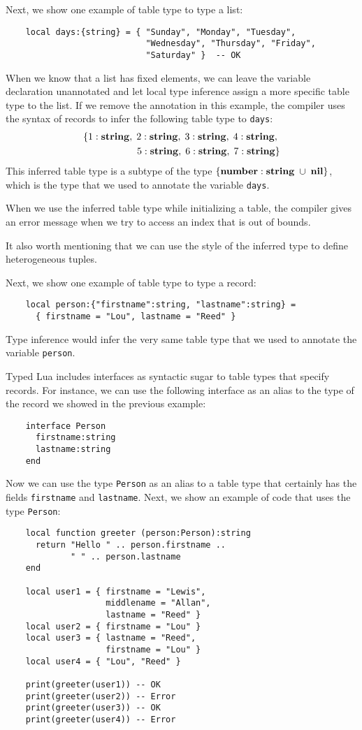 Next, we show one example of table type to type a list:
\begin{verbatim}
    local days:{string} = { "Sunday", "Monday", "Tuesday",
                            "Wednesday", "Thursday", "Friday",
                            "Saturday" }  -- OK
\end{verbatim}

When we know that a list has fixed elements, we can leave the
variable declaration unannotated and let local type inference assign
a more specific table type to the list.
If we remove the annotation in this example, the compiler uses the
syntax of records to infer the following table type to \texttt{days}:
\begin{align*}
\{{1:\mathbf{string}},\;{2:\mathbf{string}},\;{3:\mathbf{string}},\;{4:\mathbf{string}},\;\\
{5:\mathbf{string}},\;{6:\mathbf{string}},\;{7:\mathbf{string}}\}
\end{align*}
This inferred table type is a subtype of the type
$\{\mathbf{number}:\mathbf{string}\;\cup\;\mathbf{nil}\}$, which is the type that we used to
annotate the variable \texttt{days}.

When we use the inferred table type while initializing a table, the
compiler gives an error message when we try to access an index that
is out of bounds.

It also worth mentioning that we can use the style of the inferred
type to define heterogeneous tuples.

Next, we show one example of table type to type a record:
\begin{verbatim}
    local person:{"firstname":string, "lastname":string} =
      { firstname = "Lou", lastname = "Reed" } 
\end{verbatim}

Type inference would infer the very same table type that we used to
annotate the variable \texttt{person}.

Typed Lua includes interfaces as syntactic sugar to table types
that specify records.
For instance, we can use the following interface as an alias to the
type of the record we showed in the previous example:
\begin{verbatim}
    interface Person
      firstname:string
      lastname:string
    end
\end{verbatim}

Now we can use the type \texttt{Person} as an alias to a table type
that certainly has the fields \texttt{firstname} and \texttt{lastname}.
Next, we show an example of code that uses the type \texttt{Person}:
\begin{verbatim}
    local function greeter (person:Person):string
      return "Hello " .. person.firstname ..
             " " .. person.lastname
    end

    local user1 = { firstname = "Lewis",
                    middlename = "Allan",
                    lastname = "Reed" }
    local user2 = { firstname = "Lou" }
    local user3 = { lastname = "Reed",
                    firstname = "Lou" }
    local user4 = { "Lou", "Reed" }

    print(greeter(user1)) -- OK
    print(greeter(user2)) -- Error
    print(greeter(user3)) -- OK
    print(greeter(user4)) -- Error
\end{verbatim}

